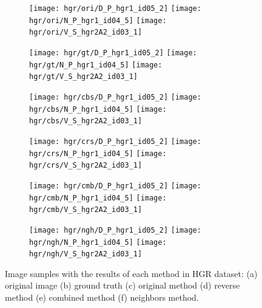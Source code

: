 \begin{figure}[!htb]
    \centering
    \begin{subfigure}[t]{0.15\textwidth}
        \texttt{[image: hgr/ori/D\_P\_hgr1\_id05\_2]}
        \texttt{[image: hgr/ori/N\_P\_hgr1\_id04\_5]}
        \texttt{[image: hgr/ori/V\_S\_hgr2A2\_id03\_1]}
        \caption{}
    \end{subfigure}
    \begin{subfigure}[t]{0.15\textwidth}
        \texttt{[image: hgr/gt/D\_P\_hgr1\_id05\_2]}
        \texttt{[image: hgr/gt/N\_P\_hgr1\_id04\_5]}
        \texttt{[image: hgr/gt/V\_S\_hgr2A2\_id03\_1]}
        \caption{}
    \end{subfigure}
    \begin{subfigure}[t]{0.15\textwidth}
        \texttt{[image: hgr/cbs/D\_P\_hgr1\_id05\_2]}
        \texttt{[image: hgr/cbs/N\_P\_hgr1\_id04\_5]}
        \texttt{[image: hgr/cbs/V\_S\_hgr2A2\_id03\_1]}
        \caption{}
    \end{subfigure}
    \begin{subfigure}[t]{0.15\textwidth}
        \texttt{[image: hgr/crs/D\_P\_hgr1\_id05\_2]}
        \texttt{[image: hgr/crs/N\_P\_hgr1\_id04\_5]}
        \texttt{[image: hgr/crs/V\_S\_hgr2A2\_id03\_1]}
        \caption{}
    \end{subfigure}
    \begin{subfigure}[t]{0.15\textwidth}
        \texttt{[image: hgr/cmb/D\_P\_hgr1\_id05\_2]}
        \texttt{[image: hgr/cmb/N\_P\_hgr1\_id04\_5]}
        \texttt{[image: hgr/cmb/V\_S\_hgr2A2\_id03\_1]}
        \caption{}
    \end{subfigure}
    \begin{subfigure}[t]{0.15\textwidth}
        \texttt{[image: hgr/ngh/D\_P\_hgr1\_id05\_2]}
        \texttt{[image: hgr/ngh/N\_P\_hgr1\_id04\_5]}
        \texttt{[image: hgr/ngh/V\_S\_hgr2A2\_id03\_1]}
        \caption{}
    \end{subfigure}

    \caption[Image samples with the results of each method in HGR dataset]{Image samples with the results of each method in HGR dataset: (a) original image (b) ground truth (c) original method \cite{brancati:17} (d) reverse method (e) combined method (f) neighbors method.}
    \label{fig:results_hgr}
\end{figure}


